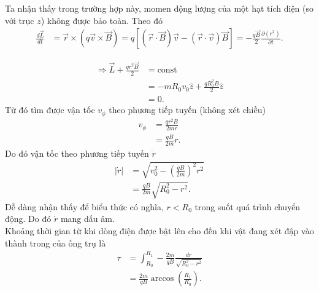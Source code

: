 Ta nhận thấy trong trường hợp này, momen động lượng của một hạt tích điện (so với trục $z$) không được bảo toàn.
Theo đó
\begin{equation} \label{eq5_p3_d2}
\begin{split}
\frac{d \vec{L}}{d t} &= \vec{r} \times (q \vec{v} \times \vec{B})= q[(\vec{r} \cdot \vec{B})\vec{v} - (\vec{r} \cdot \vec{v})\vec{B}]= -\frac{q\vec{B}}{2} \frac{\partial (r^2)}{\partial t}.
\end{split}
\end{equation}

\begin{equation} \label{eq6_p3_d2}
\begin{split}
\Rightarrow \vec{L} + \frac{qr^2 \vec{B}}{2} &= \mathrm{const}\\
&= -mR_0 v_0 \hat{z} + \frac{qR_0^2 B}{2} \hat{z}\\
&= 0.
\end{split}
\end{equation}
Từ đó tìm được vận tốc $v_{\phi}$ theo phương tiếp tuyến (không xét chiều)
\begin{equation} \label{eq7_p3_d2}
\begin{split}
    v_{\phi} &= \frac{qr^2 B}{2mr}\\
&= \frac{qB}{2m}r.
\end{split}
\end{equation}
Do đó vận tốc theo phương tiếp tuyến $\dot{r}$
\begin{equation} \label{eq8_p3_d2}
\begin{split}
|\dot{r}| &= \sqrt{v_0^2 - \left(\frac{qB}{2m}\right)^2 r^2} \\
&= \frac{qB}{2m} \sqrt{R_0^2 - r^2}.
\end{split}
\end{equation}
Dễ dàng nhận thấy để biểu thức có nghĩa, $r < R_0$ trong suốt quá trình chuyển động. Do đó $\dot{r}$ mang dấu âm.\\
Khoảng thời gian từ khi dòng điện được bật lên cho đến khi vật đang xét đập vào thành trong của ống trụ là
\begin{equation} \label{eq9_p3_d2}
\begin{split}
\tau &= \int_{R_0}^{R_1} -\frac{2m}{qB} \frac{d r}{\sqrt{R_0^2 - r^2}}\\
&= \frac{2m}{qB} \arccos \left(\frac{R_1}{R_0}\right).
\end{split}
\end{equation}

